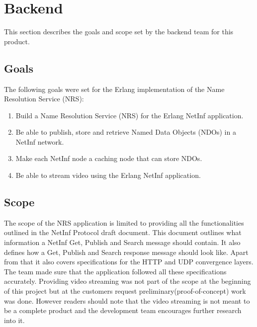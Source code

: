 \section{Backend}
This section describes the goals and scope set by the backend team for this product.

\subsection{Goals}
The following goals were set for the Erlang implementation of the Name Resolution Service (NRS):
\begin{enumerate}

\item {Build a Name Resolution Service (NRS) for the Erlang NetInf application.}\\ 
\item {Be able to publish, store and retrieve Named Data Objects (NDOs) in a NetInf network.}\\
\item {Make each NetInf node a caching node that can store NDOs.}\\
\item {Be able to stream video using the Erlang NetInf application.}\\
\end{enumerate}

\subsection{Scope}
The scope of the NRS application is limited to providing all the functionalities outlined in the NetInf Protocol draft document. \cite{netinfproto} This document outlines what information a NetInf Get, Publish and Search message should contain. It also defines how a Get, Publish and Search response message should look like. Apart from that it also covers specifications for the HTTP and UDP convergence layers. The team made sure that the application followed all these specifications accurately. Providing video streaming was not part of the scope at the beginning of this project but at the customers request preliminary(proof-of-concept) work was done. However readers should note that the video streaming is not meant to be a complete product and the development team encourages further research into it.
